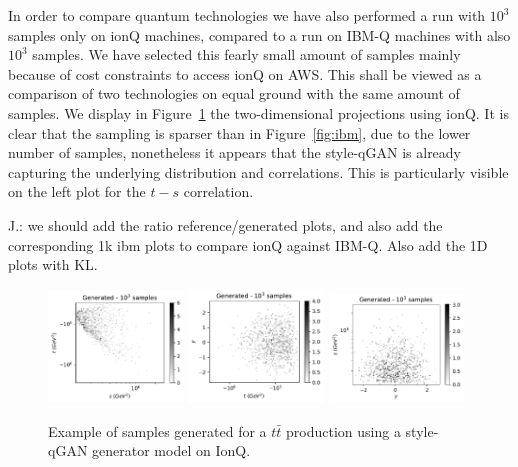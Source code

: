 \documentclass[twocolumn,preprintnumbers,superscriptaddress]{revtex4-2}
\begin{document}
In order to compare quantum technologies we have also performed a run
with $10^3$ samples only on ionQ machines, compared to a run on IBM-Q
machines with also $10^3$ samples. We have selected this fearly small
amount of samples mainly because of cost constraints to access ionQ on
AWS. This shall be viewed as a comparison of two technologies on equal
ground with the same amount of samples. We display in
Figure~\ref{fig:ionq} the two-dimensional projections using ionQ. It
is clear that the sampling is sparser than in Figure~\ref{fig:ibm},
due to the lower number of samples, nonetheless it appears that the
style-qGAN is already capturing the underlying distribution and
correlations. This is particularly visible on the left plot for the
$t-s$ correlation.

{\color{red} J.: we should add the ratio reference/generated plots,
  and also add the corresponding 1k ibm plots to compare ionQ against
  IBM-Q. Also add the 1D plots with KL.}


\begin{figure}

  \includegraphics[width=0.32\textwidth]{plots/hardware_1k/ionQ/s-t_FAKE_ionQ_1k.pdf}%
  \includegraphics[width=0.32\textwidth]{plots/hardware_1k/ionQ/t-y_FAKE_ionQ_1k.pdf}%
  \includegraphics[width=0.32\textwidth]{plots/hardware_1k/ionQ/y-s_FAKE_ionQ_1k.pdf}

  \caption{\label{fig:ionq}Example of samples generated for a $t\bar{t}$
    production using a style-qGAN generator model on IonQ.}
\end{figure}
\end{document}
